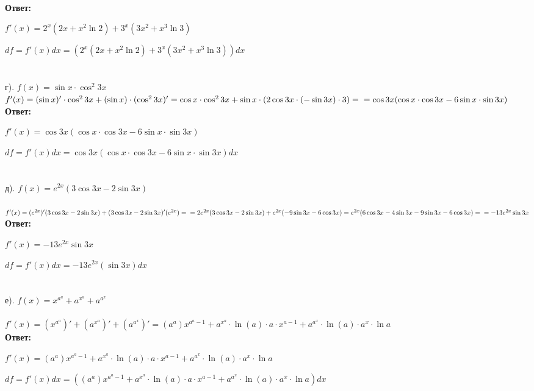 \documentclass[a4paper, 12pt]{article}
\begin{document}
    \\ \textbf{Ответ: }
    \par $f'(x) = 2^x(2x + x^2\ln 2) + 3^x(3x^2 + x^3 \ln 3)$
    \par $df = f'(x)dx = (2^x(2x + x^2\ln 2) + 3^x(3x^2 + x^3 \ln 3))dx$
    \\
    \\
    \\ г). $f(x) = \sin x \cdot \cos ^2 3x$
    \\ $f'(x) = (\sin x)' \cdot \cos ^2 3x + (\sin x) \cdot (\cos ^2 3x)' = \cos x \cdot \cos ^2 3x + \sin x \cdot (2\cos 3x \cdot (-\sin 3x) \cdot 3) =
    \\ = \cos 3x (\cos x \cdot \cos 3x - 6\sin x \cdot \sin 3x)$
    \\ \textbf{Ответ: }
    \par $f'(x) = \cos 3x (\cos x \cdot \cos 3x - 6\sin x \cdot \sin 3x)$
    \par $df = f'(x)dx = \cos 3x (\cos x \cdot \cos 3x - 6\sin x \cdot \sin 3x)dx$
    \\
    \\
    \\ д). $f(x) = e^{2x}(3\cos 3x - 2\sin 3x)$
    \\
    \\ $f'(x) = (e^{2x})'(3\cos 3x - 2\sin 3x) + (3\cos 3x - 2\sin 3x)'(e^{2x}) = 
    \\ = 2e^{2x}(3\cos 3x - 2\sin 3x) + e^{2x}(-9\sin 3x - 6 \cos 3x) = e^{2x}(6\cos 3x - 4\sin 3x -9\sin 3x - 6 \cos 3x) = 
    \\ = -13e^{2x}\sin 3x$
    \\ \textbf{Ответ: }
    \par $f'(x) = -13e^{2x}\sin 3x$
    \par $df = f'(x)dx = -13e^{2x}(\sin 3x)dx$
    \\
    \\
    \\ е). $f(x) = x^{a^a} + a^{x^a} + a^{a^x}$
    \\
    \\ $f'(x) = (x^{a^a})' + (a^{x^a})' + (a^{a^x})' = (a^a)x^{a^a - 1} + a^{x^a} \cdot \ln (a) \cdot a \cdot x^{a - 1} + a^{a^x} \cdot \ln (a) \cdot a^x \cdot \ln a$
    \\ \textbf{Ответ: }
    \par $f'(x) = (a^a)x^{a^a - 1} + a^{x^a} \cdot \ln (a) \cdot a \cdot x^{a - 1} + a^{a^x} \cdot \ln (a) \cdot a^x \cdot \ln a$
    \par $df = f'(x)dx = ((a^a)x^{a^a - 1} + a^{x^a} \cdot \ln (a) \cdot a \cdot x^{a - 1} + a^{a^x} \cdot \ln (a) \cdot a^x \cdot \ln a)dx$
\end{document}
